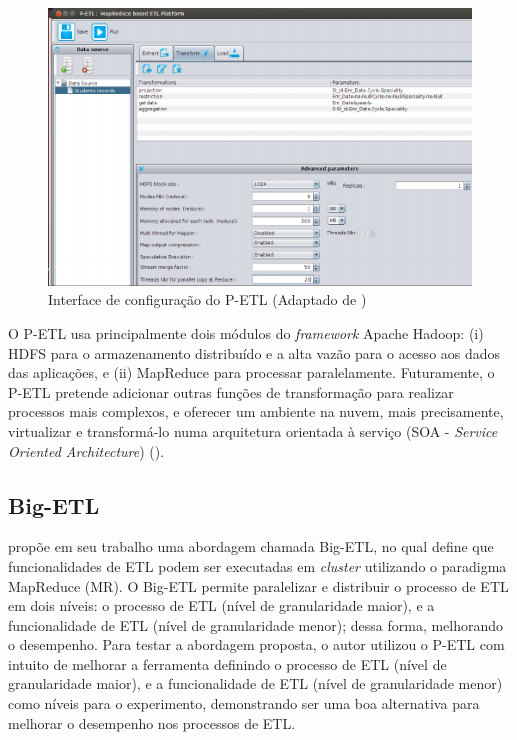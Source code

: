 \begin{figure}[h]
	\centering
	\includegraphics[scale=0.9]{fig/petl.png}
	\caption{Interface de configuração do P-ETL (Adaptado de \cite{bala:2014})}
	\label{petl}
\end{figure}

O P-ETL usa principalmente dois módulos do \textit{framework} Apache Hadoop: (i) HDFS para o armazenamento distribuído e a alta vazão para o acesso aos dados das aplicações, e (ii) MapReduce para processar paralelamente. Futuramente, o P-ETL pretende adicionar outras funções de transformação para realizar processos mais complexos, e oferecer um ambiente na nuvem, mais precisamente, virtualizar e transformá-lo numa arquitetura orientada à serviço (SOA - \textit{Service Oriented Architecture}) (\cite{bala:2014}).


\subsection{Big-ETL}

\cite{bala:2015} propõe em seu trabalho uma abordagem chamada Big-ETL, no qual define que funcionalidades de ETL podem ser executadas em \textit{cluster} utilizando o paradigma MapReduce (MR). O Big-ETL permite paralelizar e distribuir o processo de ETL em dois níveis: o processo de ETL (nível de granularidade maior), e a funcionalidade de ETL (nível de granularidade menor); dessa forma, melhorando o desempenho. Para testar a abordagem proposta, o autor utilizou o P-ETL com intuito de melhorar a ferramenta definindo o processo de ETL (nível de granularidade maior), e a funcionalidade de ETL (nível de granularidade menor) como níveis para o experimento, demonstrando ser uma boa alternativa para melhorar o desempenho nos processos de ETL.

